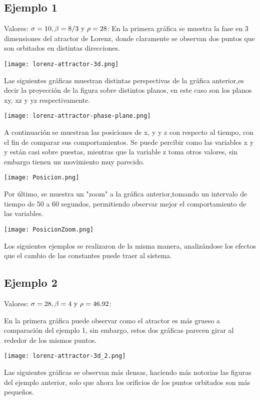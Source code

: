 \documentclass{article}
\begin{document}
\subsection{Ejemplo 1}
Valores: $\sigma = 10, \beta = 8/3 \textup{ y } \rho = 28$:
En la primera gráfica se muestra la fase en 3 dimensiones del atractor de Lorenz, donde claramente se observan dos puntos que son orbitados en distintas direcciones.
\begin{center}
    \texttt{[image: lorenz-attractor-3d.png]}
\end{center}
Las siguientes gráficas muestran distintas perspectivas de la gráfica anterior,es decir la proyección de la figura sobre distintos planos, en este caso son los planos xy, xz y yz respectivamente. 
\begin{center}
    \texttt{[image: lorenz-attractor-phase-plane.png]}
\end{center}
A continuación se muestran las posiciones de x, y y z con respecto al tiempo, con el fin de comparar sus comportamientos. Se puede percibir como las variables x y y están casi sobre puestas, mientras que la variable z toma otros valores, sin embargo tienen un movimiento muy parecido.
\begin{center}
    \texttt{[image: Posicion.png]}
\end{center}
Por último, se muestra un "zoom" a la gráfica anterior,tomando un intervalo de tiempo de 50 a 60 segundos, permitiendo observar mejor el comportamiento de las variables.
\begin{center}
    \texttt{[image: PosicionZoom.png]}
\end{center}

Los siguientes ejemplos se realizaron de la misma manera, analizándose los efectos que el cambio de las constantes puede traer al sistema.

\subsection{Ejemplo 2}
Valores: $\sigma = 28, \beta = 4 \textup{ y } \rho = 46.92$:

En la primera gráfica puede observar como el atractor es más grueso a comparación del ejemplo 1, sin embargo, estos dos gráficas parecen girar al rededor de los mismos puntos.
\begin{center}
    \texttt{[image: lorenz-attractor-3d\_2.png]}
\end{center}
Las siguientes gráficas se observan más densas, haciendo más notorias las figuras del ejemplo anterior, solo que ahora los orificios de los puntos orbitados son más pequeños.
\end{document}
